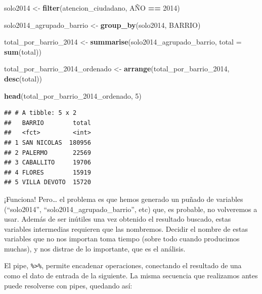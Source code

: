 \documentclass[]{book}
\newenvironment{Shaded}{\begin{snugshade}}{\end{snugshade}}
\newcommand{\KeywordTok}[1]{\textcolor[rgb]{0.13,0.29,0.53}{\textbf{#1}}}
\newcommand{\DataTypeTok}[1]{\textcolor[rgb]{0.13,0.29,0.53}{#1}}
\newcommand{\DecValTok}[1]{\textcolor[rgb]{0.00,0.00,0.81}{#1}}
\newcommand{\StringTok}[1]{\textcolor[rgb]{0.31,0.60,0.02}{#1}}
\newcommand{\OperatorTok}[1]{\textcolor[rgb]{0.81,0.36,0.00}{\textbf{#1}}}
\newcommand{\NormalTok}[1]{#1}
\begin{document}
\begin{Shaded}
\begin{Highlighting}[]
\NormalTok{solo2014 <-}\StringTok{ }\KeywordTok{filter}\NormalTok{(atencion_ciudadano, AÑO }\OperatorTok{==}\StringTok{ }\DecValTok{2014}\NormalTok{)}

\NormalTok{solo2014_agrupado_barrio <-}\StringTok{ }\KeywordTok{group_by}\NormalTok{(solo2014, BARRIO)}

\NormalTok{total_por_barrio_}\DecValTok{2014}\NormalTok{ <-}\StringTok{ }\KeywordTok{summarise}\NormalTok{(solo2014_agrupado_barrio, }\DataTypeTok{total =} \KeywordTok{sum}\NormalTok{(total))}

\NormalTok{total_por_barrio_2014_ordenado <-}\StringTok{ }\KeywordTok{arrange}\NormalTok{(total_por_barrio_}\DecValTok{2014}\NormalTok{, }\KeywordTok{desc}\NormalTok{(total))}

\KeywordTok{head}\NormalTok{(total_por_barrio_2014_ordenado, }\DecValTok{5}\NormalTok{)}
\end{Highlighting}
\end{Shaded}

\begin{verbatim}
## # A tibble: 5 x 2
##   BARRIO        total
##   <fct>         <int>
## 1 SAN NICOLAS  180956
## 2 PALERMO       22569
## 3 CABALLITO     19706
## 4 FLORES        15919
## 5 VILLA DEVOTO  15720
\end{verbatim}

¡Funciona! Pero\ldots{} el problema es que hemos generado un puñado de
variables (``solo2014'', ``solo2014\_agrupado\_barrio'', etc) que, es
probable, no volveremos a usar. Además de ser inútiles una vez obtenido
el resultado buscado, estas variables intermedias requieren que las
nombremos. Decidir el nombre de estas variables que no nos importan toma
tiempo (sobre todo cuando producimos muchas), y nos distrae de lo
importante, que es el análisis.

El pipe, \texttt{\%\textgreater{}\%}, permite encadenar operaciones,
conectando el resultado de una como el dato de entrada de la siguiente.
La misma secuencia que realizamos antes puede resolverse con pipes,
quedando así:

\begin{Shaded}
\end{Shaded}
\end{document}
